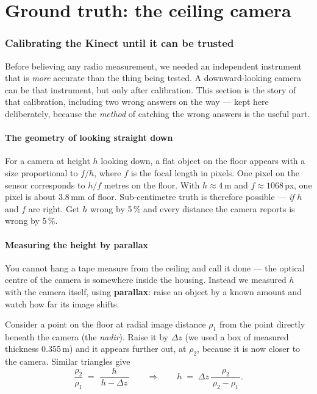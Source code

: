 \documentclass[11pt,a4paper]{article}
\begin{document}
\part{Ground truth: the ceiling camera}

\section{Calibrating the Kinect until it can be trusted}
\label{sec:camera}

Before believing any radio measurement, we needed an independent instrument that is
\emph{more} accurate than the thing being tested. A downward-looking camera can be
that instrument, but only after calibration. This section is the story of that
calibration, including two wrong answers on the way --- kept here deliberately,
because the \emph{method} of catching the wrong answers is the useful part.

\subsection{The geometry of looking straight down}

For a camera at height $h$ looking down, a flat object on the floor appears with a
size proportional to $f/h$, where $f$ is the focal length in pixels. One pixel on
the sensor corresponds to $h/f$ metres on the floor. With $h \approx 4$\,m and
$f \approx 1068$\,px, one pixel is about 3.8\,mm of floor. Sub-centimetre truth is
therefore possible --- \emph{if} $h$ and $f$ are right. Get $h$ wrong by 5\,\% and
every distance the camera reports is wrong by 5\,\%.

\subsection{Measuring the height by parallax}
\label{sec:parallax}

You cannot hang a tape measure from the ceiling and call it done --- the optical
centre of the camera is somewhere inside the housing. Instead we measured $h$ with
the camera itself, using \textbf{parallax}: raise an object by a known amount and
watch how far its image shifts.

Consider a point on the floor at radial image distance $\rho_1$ from the point
directly beneath the camera (the \emph{nadir}). Raise it by $\Delta z$ (we used a
box of measured thickness 0.355\,m) and it appears further out, at $\rho_2$,
because it is now closer to the camera. Similar triangles give
\begin{equation}
\frac{\rho_2}{\rho_1} \;=\; \frac{h}{\,h-\Delta z\,}
\qquad\Longrightarrow\qquad
h \;=\; \Delta z \,\frac{\rho_2}{\,\rho_2-\rho_1\,}.
\end{equation}
\end{document}
